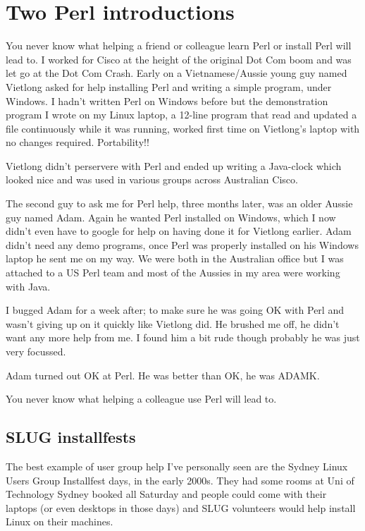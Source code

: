 \documentclass{article}
\begin{document}
\section{Two Perl introductions}

You never know what helping a friend or colleague learn Perl or
install Perl will lead to. I worked for Cisco at the height of the
original Dot Com boom and was let go at the Dot Com Crash. Early on a
Vietnamese/Aussie young guy named Vietlong asked for help installing
Perl and writing a simple program, under Windows. I hadn't written Perl
on Windows before but the demonstration program I wrote on my Linux
laptop, a 12-line program that read and updated a file continuously
while it was running, worked first time on Vietlong's laptop with no
changes required. Portability!!

Vietlong didn't perservere with Perl and ended up writing a Java-clock
which looked nice and was used in various groups across Australian
Cisco.

The second guy to ask me for Perl help, three months later, was an older
Aussie guy named Adam. Again he wanted Perl installed on Windows,
which I now didn't even have to google for help on having done it for
Vietlong earlier. Adam didn't need any demo programs, once Perl was
properly installed on his Windows laptop he sent me on my way. We were
both in the Australian office but I was attached to a US Perl team and
most of the Aussies in my area were working with Java.

I bugged Adam for a week after; to make sure he was going OK
with Perl and wasn't giving up on it quickly like Vietlong did. He
brushed me off, he didn't want any more help from me. I found him
a bit rude though probably he was just very focussed.

Adam turned out OK at Perl. He was better than OK, he was ADAMK.

You never know what helping a colleague use Perl will lead to.

\subsection{SLUG installfests}

The best example of user group help I've personally seen are the
Sydney Linux Users Group Installfest days, in the early 2000s. They
had some rooms at Uni of Technology Sydney booked all Saturday and
people could come with their laptops (or even desktops in those days)
and SLUG volunteers would help install Linux on their machines.
\end{document}
